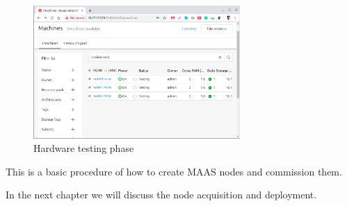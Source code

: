 \begin{figure}[!ht]
    \centering
    \includegraphics[width=0.7\textwidth]{images/5-7.png}
    \caption{Hardware testing phase}
\end{figure}

This is a basic procedure of how to create MAAS nodes and commission them.

In the next chapter we will discuss the node acquisition and deployment.